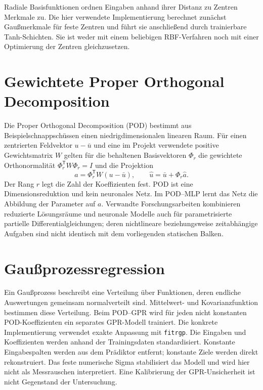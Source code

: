 Radiale Basisfunktionen ordnen Eingaben anhand ihrer Distanz zu Zentren Merkmale zu\cite{broomhead1988}. Die hier verwendete Implementierung berechnet zunächst Gaußmerkmale für feste Zentren und führt sie anschließend durch trainierbare Tanh-Schichten. Sie ist weder mit einem beliebigen RBF-Verfahren noch mit einer Optimierung der Zentren gleichzusetzen.

\section{Gewichtete Proper Orthogonal Decomposition}
Die Proper Orthogonal Decomposition (POD) bestimmt aus Beispielschnappschüssen einen niedrigdimensionalen linearen Raum\cite{sirovich1987}. Für einen zentrierten Feldvektor $u-\bar u$ und eine im Projekt verwendete positive Gewichtsmatrix $W$ gelten für die behaltenen Basisvektoren $\Phi_r$ die gewichtete Orthonormalität $\Phi_r^{\mathsf T}W\Phi_r=I$ und die Projektion
\begin{equation}
 a=\Phi_r^{\mathsf T}W(u-\bar u),\qquad
 \widehat u=\bar u+\Phi_r\widehat a.
 \label{eq:pod}
\end{equation}
Der Rang $r$ legt die Zahl der Koeffizienten fest. POD ist eine Dimensionsreduktion und kein neuronales Netz. Im POD--MLP lernt das Netz die Abbildung der Parameter auf $a$. Verwandte Forschungsarbeiten kombinieren reduzierte Lösungsräume und neuronale Modelle auch für parametrisierte partielle Differentialgleichungen; deren nichtlineare beziehungsweise zeitabhängige Aufgaben sind nicht identisch mit dem vorliegenden statischen Balken\cite{salvador2021,fresca2021}.

\section{Gaußprozessregression}
Ein Gaußprozess beschreibt eine Verteilung über Funktionen, deren endliche Auswertungen gemeinsam normalverteilt sind. Mittelwert- und Kovarianzfunktion bestimmen diese Verteilung\cite{rasmussen2006}. Beim POD--GPR wird für jeden nicht konstanten POD-Koeffizienten ein separates GPR-Modell trainiert. Die konkrete Implementierung verwendet exakte Anpassung mit \texttt{fitrgp}\cite{mathworks2025}. Die Eingaben und Koeffizienten werden anhand der Trainingsdaten standardisiert. Konstante Eingabespalten werden aus dem Prädiktor entfernt; konstante Ziele werden direkt rekonstruiert. Das feste numerische Sigma stabilisiert das Modell und wird hier nicht als Messrauschen interpretiert. Eine Kalibrierung der GPR-Unsicherheit ist nicht Gegenstand der Untersuchung.

